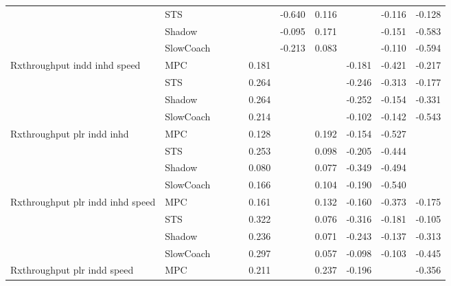 \begin{tabular}{|l|l|*{9}{c|}}
                              & STS &       &        &        &     & -0.640 &  0.116 &      &  -0.116 &   -0.128 \\
                              & Shadow &       &        &        &     & -0.095 &  0.171 &      &  -0.151 &   -0.583 \\
                              & SlowCoach &       &        &        &     & -0.213 &  0.083 &      &  -0.110 &   -0.594 \\
\midrule
Rxthroughput indd inhd speed    & MPC &       &        &        &  0.181 &     &     &  -0.181 &  -0.421 &   -0.217 \\
                              & STS &       &        &        &  0.264 &     &     &  -0.246 &  -0.313 &   -0.177 \\
                              & Shadow &       &        &        &  0.264 &     &     &  -0.252 &  -0.154 &   -0.331 \\
                              & SlowCoach &       &        &        &  0.214 &     &     &  -0.102 &  -0.142 &   -0.543 \\
\midrule
Rxthroughput plr indd inhd    & MPC &       &        &        &  0.128 &     &  0.192 &  -0.154 &  -0.527 &       \\
                              & STS &       &        &        &  0.253 &     &  0.098 &  -0.205 &  -0.444 &       \\
                              & Shadow &       &        &        &  0.080 &     &  0.077 &  -0.349 &  -0.494 &       \\
                              & SlowCoach &       &        &        &  0.166 &     &  0.104 &  -0.190 &  -0.540 &       \\
\midrule
Rxthroughput plr indd inhd speed    & MPC &       &        &        &  0.161 &     &  0.132 &  -0.160 &  -0.373 &   -0.175 \\
                              & STS &       &        &        &  0.322 &     &  0.076 &  -0.316 &  -0.181 &   -0.105 \\
                              & Shadow &       &        &        &  0.236 &     &  0.071 &  -0.243 &  -0.137 &   -0.313 \\
                              & SlowCoach &       &        &        &  0.297 &     &  0.057 &  -0.098 &  -0.103 &   -0.445 \\
\midrule
Rxthroughput plr indd speed    & MPC &       &        &        &  0.211 &     &  0.237 &  -0.196 &      &   -0.356 \\

\end{tabular}
